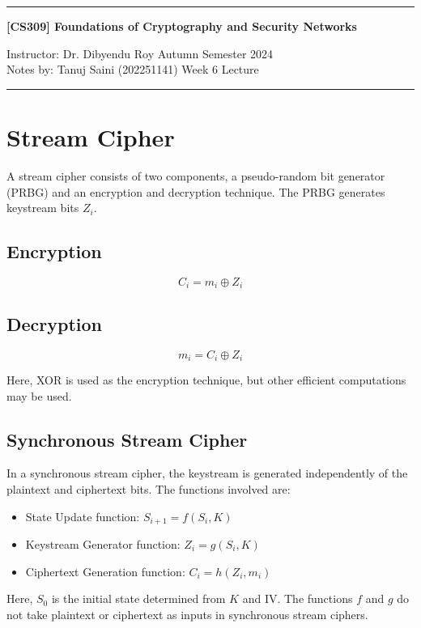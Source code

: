 \documentclass{article}
\begin{document}
\noindent
\rule{\textwidth}{1pt}
\begin{center}
{\bf [CS309] Foundations of Cryptography and Security Networks}
\end{center}
Instructor: Dr. Dibyendu Roy \hfill Autumn Semester 2024\\
Notes by: Tanuj Saini (202251141) \hfill Week 6 Lecture
\\
\rule{\textwidth}{1pt}


\section{Stream Cipher}
A stream cipher consists of two components, a pseudo-random bit generator (PRBG) and an encryption and decryption technique. The PRBG generates keystream bits $Z_i$.

\subsection{Encryption}
\[
C_i = m_i \oplus Z_i
\]

\subsection{Decryption}
\[
m_i = C_i \oplus Z_i
\]

Here, XOR is used as the encryption technique, but other efficient computations may be used.

\subsection{Synchronous Stream Cipher}
In a synchronous stream cipher, the keystream is generated independently of the plaintext and ciphertext bits. The functions involved are:

\begin{itemize}
    \item State Update function: $S_{i+1} = f(S_i, K)$
    \item Keystream Generator function: $Z_i = g(S_i, K)$
    \item Ciphertext Generation function: $C_i = h(Z_i, m_i)$
\end{itemize}

Here, $S_0$ is the initial state determined from $K$ and IV. The functions $f$ and $g$ do not take plaintext or ciphertext as inputs in synchronous stream ciphers.
\end{document}

